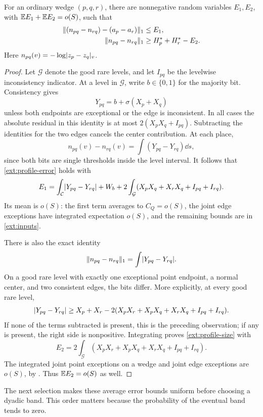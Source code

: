 \begin{lemma}\label{ext:profiles}
For an ordinary wedge \((p,q,r)\), there are nonnegative random variables
\(E_1,E_2\), with \(\mathbb E E_1+\mathbb E E_2=o(S)\), such that
\begin{align}
 \lVert (n_{pq}-n_{rq})-(a_p-a_r)\rVert_1&\le E_1,
                                      \label{ext:profile-error}\\
 \lVert n_{pq}-n_{rq}\rVert_1&\ge H_p^*+H_r^*-E_2.
                                      \label{ext:profile-size}
\end{align}
Here \(n_{pq}(v)=-\log\lvert z_p-z_q\rvert_v\).
\end{lemma}

\begin{proof}
Let \(\mathcal G\) denote the good rare levels, and let \(I_{pq}\) be
the levelwise inconsistency indicator.  At a level in \(\mathcal G\),
write \(b\in\{0,1\}\) for the majority bit.  Consistency gives
\[
 Y_{pq}=b+\sigma(X_p+X_q)
\]
unless both endpoints are exceptional or the edge is inconsistent.
In all cases the absolute residual in this identity is at most
\(2(X_pX_q+I_{pq})\).  Subtracting the identities for the two edges
cancels the center contribution.  At each place,
\[
 n_{pq}(v)-n_{rq}(v)=\int(Y_{pq}-Y_{rq})\dd s,
\]
since both bits are single thresholds inside the level interval.
It follows that \eqref{ext:profile-error} holds with
\[
 E_1=\int_{\mathcal C}\lvert Y_{pq}-Y_{rq}\rvert+W_b
       +2\int_{\mathcal G}(X_pX_q+X_rX_q+I_{pq}+I_{rq}).
\]
Its mean is \(o(S)\): the first term averages to \(C_Q=o(S)\), the
joint edge exceptions have integrated expectation \(o(S)\), and the
remaining bounds are in \eqref{ext:inputs}.

There is also the exact identity
\[
 \lVert n_{pq}-n_{rq}\rVert_1=\int\lvert Y_{pq}-Y_{rq}\rvert.
\]
On a good rare level with exactly one exceptional point endpoint, a
normal center, and two consistent edges, the bits differ.  More
explicitly, at every good rare level,
\[
 \lvert Y_{pq}-Y_{rq}\rvert\ge X_p+X_r
 -2(X_pX_r+X_pX_q+X_rX_q+I_{pq}+I_{rq}).
\]
If none of the terms subtracted is present, this is the preceding
observation; if any is present, the right side is nonpositive.
Integrating proves \eqref{ext:profile-size} with
\[
 E_2=2\int_{\mathcal G}
                   (X_pX_r+X_pX_q+X_rX_q+I_{pq}+I_{rq}).
\]
The integrated joint point exceptions on a wedge and joint edge
exceptions are \(o(S)\), by .
Thus \(\mathbb E E_2=o(S)\) as well.
\end{proof}

The next selection makes these average error bounds uniform before
choosing a dyadic band.  This order matters because the probability of
the eventual band tends to zero.

